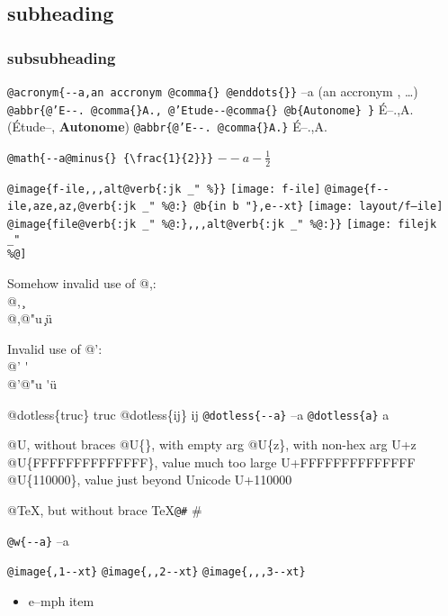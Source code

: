 \documentclass{book}
\newcommand{\GNUTexinfoplaceholder}[1]{}
\newcommand{\GNUTexinfonopagebreakheading}[2]{\let\clearpage\relax \let\cleardoublepage\relax \let\thispagestyle\GNUTexinfoplaceholder #1{#2}}
\renewcommand{\includegraphics}[1]{\fbox{FIG #1}}
\begin{document}
\GNUTexinfonopagebreakheading{\subsection*}{subheading}

\GNUTexinfonopagebreakheading{\subsubsection*}{subsubheading}


\texttt{@acronym\{{-}{-}a,an accronym @comma\{\} @enddots\{\}\}} --a (an accronym , \dots{})
\texttt{@abbr\{@'E{-}{-}. @comma\{\}A., @'Etude{-}{-}@comma\{\} @b\{Autonome\} \}} \'{E}--.\@ ,A.\@ (\'{E}tude--, \textbf{Autonome})
\texttt{@abbr\{@'E{-}{-}. @comma\{\}A.\}} \'{E}--.\@ ,A.\@

\texttt{@math\{{-}{-}a@minus\{\} \{\textbackslash{}frac\{1\}\{2\}\}\}} $--a- {\frac{1}{2}}$

\texttt{@image\{f-ile,,,alt@verb\{:jk \_" \%\@\}\}} \texttt{[image: f-ile]}
\texttt{@image\{f{-}{-}ile,aze,az,@verb\{:jk \_" \%@:\} @b\{in b "\},e{-}{-}xt\}} \texttt{[image: layout/f--ile]}
\texttt{@image\{file@verb\{:jk \_" \%@:\},,,alt@verb\{:jk \_" \%@:\}\}} \texttt{[image: filejk \\\_" \\\%@]}




Somehow invalid use of @,:\leavevmode{}\\
@, \c{}
\leavevmode{}\\
@,@"u \c{}\"{u}

Invalid use of @':\leavevmode{}\\
@' \'{}
\leavevmode{}\\
@'@"u \'{}\"{u}

@dotless\{truc\} truc
@dotless\{ij\} ij
\texttt{@dotless\{{-}{-}a\}} --a
\texttt{@dotless\{a\}} a

@U, without braces @U\{\}, with empty arg 
@U\{z\}, with non-hex arg U+z
@U\{FFFFFFFFFFFFFF\}, value much too large U+FFFFFFFFFFFFFF
@U\{110000\}, value just beyond Unicode U+110000

@TeX, but without brace \TeX{}\texttt{@\#} \#

\texttt{@w\{{-}{-}a\}} \hbox{--a}

\texttt{@image\{,1{-}{-}xt\}} 
\texttt{@image\{,,2{-}{-}xt\}} 
\texttt{@image\{,,,3{-}{-}xt\}} 


\begin{itemize}[label=\emph{}]
\item e--mph item
\end{itemize}
\end{document}
